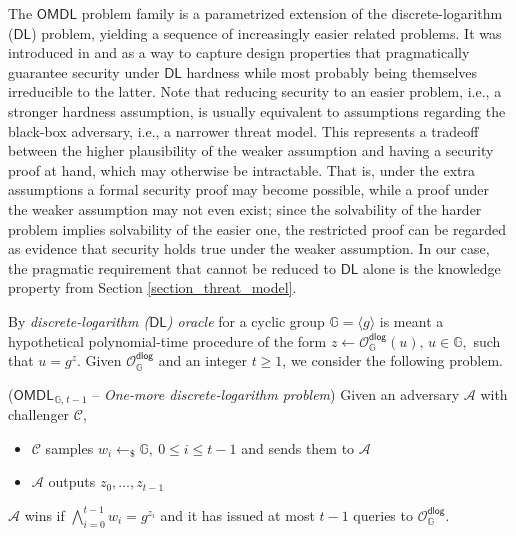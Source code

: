\documentclass{iacrtrans}
\begin{document}
The $\mathsf{OMDL}$ problem family
is a parametrized extension of
the discrete-logarithm ($\mathsf{DL}$) problem,
yielding a sequence of increasingly easier related problems.
It was introduced in
\cite{paper_bellare_palacio} and
\cite{paper_bellare_omdl}
as a way to capture design properties
that pragmatically guarantee security under
$\mathsf{DL}$ hardness
while most probably being themselves irreducible to the latter.
Note that reducing security to an easier problem,
i.e., a stronger hardness assumption,
is usually equivalent to assumptions
regarding the black-box adversary,
i.e., a narrower threat model.
This represents a tradeoff between the higher plausibility
of the weaker assumption
and having a security proof at hand,
which may otherwise be intractable.
That is, under the extra assumptions
a formal security proof may become possible,
while a proof under the weaker
assumption may not even exist;
since the solvability of the harder problem
implies solvability of the easier one,
the restricted proof can be regarded as
evidence that security holds
true under the weaker assumption.
In our case, the pragmatic requirement
that cannot be reduced to $\mathsf{DL}$  alone
is the knowledge property
from Section \ref{section_threat_model}.

By \textit{discrete-logarithm \textup{($\mathsf{DL}$)} oracle}
for a cyclic group $\mathbb{G} = \langle g \rangle$
is meant a hypothetical polynomial-time procedure of the form
$z \leftarrow \mathcal{O}_{\mathbb{G}}^{\mathsf{dlog}}(u),
\hspace{2pt} u \in \mathbb{G},$
such that
$u = g ^ z$.
Given $\mathcal{O}_{\mathbb{G}}^{\mathsf{dlog}}$
and an integer $t \ge 1$,
we consider the following problem.

\begin{attack_game}\label{omdl_attack}
\vspace{3pt}
($\mathsf{OMDL}_{\hspace{1pt}\mathbb{G},\hspace{1pt} t-1}$ --
\textit{One-more discrete-logarithm problem})
Given an adversary $\mathcal{A}$ with challenger $\mathcal{C}$,\vspace{2pt}
\begin{itemize}[label=$\circ$,leftmargin=17pt]
	\item
		$\mathcal{C}$ samples $w_i \leftarrow_\$ \mathbb{G},
		\ 0 \le i \le t-1$
		and sends them to $\mathcal{A}$\vspace{5pt}
	\item
		$\mathcal{A}$ outputs $z_0, \dots, z_{t-1}$\vspace{2.5pt}
\end{itemize}
\hspace*{0pt}%
\begin{minipage}{\dimexpr\textwidth-\parindent\relax}%
	\hspace{8pt}$\mathcal{A}$ wins if\hspace{0pt}
	$\bigwedge\limits_{i=0}^{t-1} w_i = g^{z_i}$
	and it has issued at most $t-1$ queries to
	$\mathcal{O}_{\mathbb{G}}^{\mathsf{dlog}}$.
\end{minipage}%
\vspace{3.0pt}
\end{attack_game}
\end{document}
